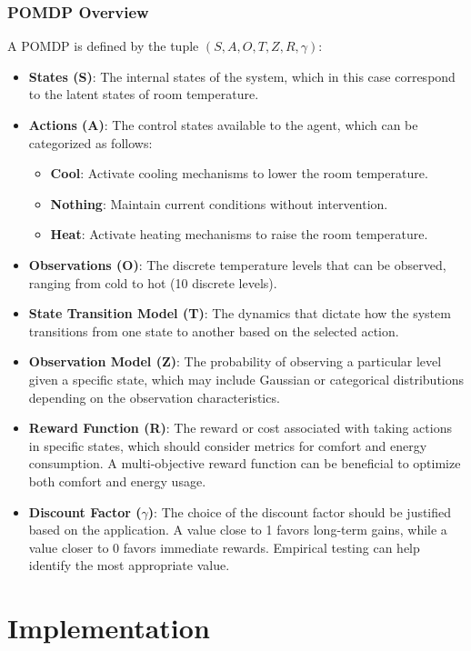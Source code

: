 \documentclass[11pt,a4paper]{article}
\begin{document}
\subsubsection{POMDP Overview}
A POMDP is defined by the tuple $(S, A, O, T, Z, R, \gamma)$:
\begin{itemize}
\item \textbf{States (S)}: The internal states of the system, which in this case correspond to the latent states of room temperature.
\item \textbf{Actions (A)}: The control states available to the agent, which can be categorized as follows:
  \begin{itemize}
  \item \textbf{Cool}: Activate cooling mechanisms to lower the room temperature.
  \item \textbf{Nothing}: Maintain current conditions without intervention.
  \item \textbf{Heat}: Activate heating mechanisms to raise the room temperature.
  \end{itemize}
\item \textbf{Observations (O)}: The discrete temperature levels that can be observed, ranging from cold to hot (10 discrete levels).
\item \textbf{State Transition Model (T)}: The dynamics that dictate how the system transitions from one state to another based on the selected action.
\item \textbf{Observation Model (Z)}: The probability of observing a particular level given a specific state, which may include Gaussian or categorical distributions depending on the observation characteristics.
\item \textbf{Reward Function (R)}: The reward or cost associated with taking actions in specific states, which should consider metrics for comfort and energy consumption. A multi-objective reward function can be beneficial to optimize both comfort and energy usage.
\item \textbf{Discount Factor ($\gamma$)}: The choice of the discount factor should be justified based on the application. A value close to 1 favors long-term gains, while a value closer to 0 favors immediate rewards. Empirical testing can help identify the most appropriate value.
\end{itemize}

\section{Implementation}
\end{document}
